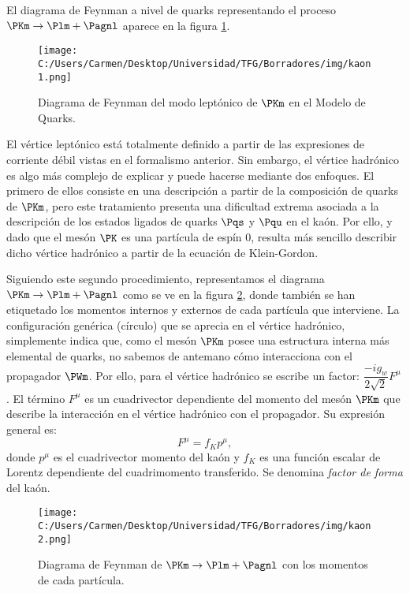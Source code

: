 El diagrama de Feynman a nivel de quarks representando el proceso $\PKm \rightarrow \Plm + \Pagnl$ aparece en la figura \ref{fig:diagrama1}.

\begin{figure}[ht!]
	\centering
	\texttt{[image: C:/Users/Carmen/Desktop/Universidad/TFG/Borradores/img/kaon1.png]}
	\caption[Diagrama de Feynman de quarks de $\PKm \rightarrow \Plm + \Pagnl$]
	{Diagrama de Feynman del modo leptónico de $\PKm$ en el Modelo de Quarks.}
	\label{fig:diagrama1}
\end{figure}

El vértice leptónico está totalmente definido a partir de las expresiones de corriente débil vistas en el formalismo anterior. Sin embargo, el vértice hadrónico es algo más complejo de explicar y puede hacerse mediante dos enfoques. El primero de ellos consiste en una descripción a partir de la composición de quarks de $\PKm$, pero este tratamiento presenta una dificultad extrema asociada a la descripción de los estados ligados de quarks $\Pqs$ y $\Pqu$ en el kaón. Por ello, y dado que el mesón $\PK$ es una partícula de espín 0, resulta más sencillo describir dicho vértice hadrónico a partir de la ecuación de Klein-Gordon.

Siguiendo este segundo procedimiento, representamos el diagrama $\PKm \rightarrow \Plm + \Pagnl$ como se ve en la figura \ref{fig:diagrama2}, donde también se han etiquetado los momentos internos y externos de cada partícula que interviene. La configuración genérica (círculo) que se aprecia en el vértice hadrónico, simplemente indica que, como el mesón $\PKm$ posee una estructura interna más elemental de quarks, no sabemos de antemano cómo interacciona con el propagador $\PWm$. Por ello, para el vértice hadrónico se escribe un factor: $\dfrac{-ig_{w}}{2\sqrt{2}}F^{\mu}$. El término $F^{\mu}$ es un cuadrivector dependiente del momento del mesón $\PKm$ que describe la interacción en el vértice hadrónico con el propagador. Su expresión general es:
\begin{equation}
F^{\mu}=f_{K}p^{\mu} ,\label{eq:formfactor}
\end{equation}
donde $p^{\mu}$ es el cuadrivector momento del kaón y  $f_{K}$ es una función escalar de Lorentz dependiente del cuadrimomento transferido. Se denomina \textit{factor de forma} del kaón. 

\begin{figure}[ht!]
	\centering
	\texttt{[image: C:/Users/Carmen/Desktop/Universidad/TFG/Borradores/img/kaon2.png]}
	\caption[Diagrama de Feynman de $\PKm \rightarrow \Plm + \Pagnl$ con los momentos]
	{Diagrama de Feynman de $\PKm \rightarrow \Plm + \Pagnl$ con los momentos de cada partícula.}
	\label{fig:diagrama2}
\end{figure}

